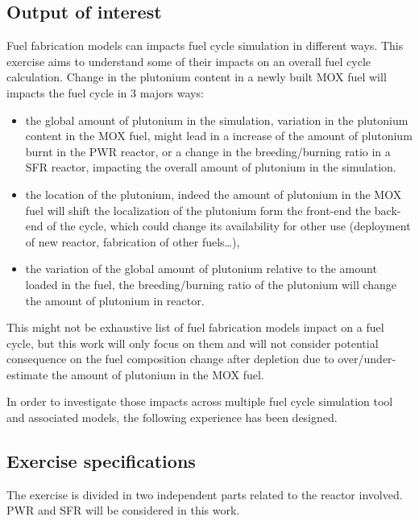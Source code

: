 \subsection{Output of interest}

Fuel fabrication models can impacts fuel cycle simulation in different ways.
This exercise aims to understand some of their impacts on an overall fuel cycle
calculation. Change in the plutonium content in a newly built MOX fuel will
impacts the fuel cycle in 3 majors ways:

\begin{itemize}
    \item the global amount of plutonium in the simulation, variation in the
        plutonium content in the MOX fuel, might lead in a increase of the
        amount of plutonium burnt in the PWR reactor, or a change in the
        breeding/burning ratio in a SFR reactor, impacting the overall amount of
        plutonium in the simulation.
    \item the location of the plutonium, indeed the amount of plutonium in the
        MOX fuel will shift the localization of the plutonium form the front-end
        the back-end of the cycle, which could change its availability for
        other use (deployment of new reactor, fabrication of other fuels\ldots),
    \item the variation of the global amount of plutonium relative to the amount
        loaded in the fuel, the breeding/burning ratio of the plutonium will
        change the amount of plutonium in reactor.
\end{itemize}

This might not be exhaustive list of fuel fabrication models impact on a fuel
cycle, but this work will only focus on them and will not consider potential
consequence on the fuel composition change after depletion due to
over/under-estimate the amount of plutonium in the MOX fuel.

In order to investigate those impacts across multiple fuel cycle simulation tool
and associated models, the following experience has been designed.

\subsection{Exercise specifications}

The exercise is divided in two independent parts related to the reactor
involved. \gls{PWR} and \gls{SFR} will be considered in this work.

